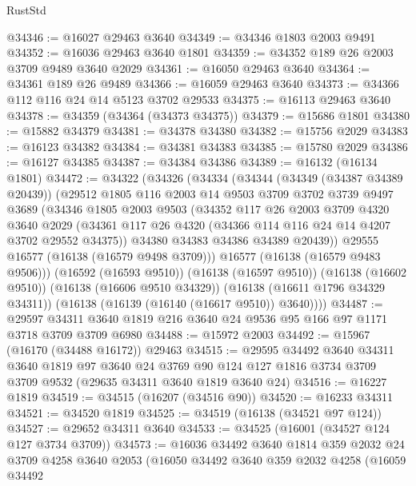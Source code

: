 \begin{lexlean}{RustStd}
\begin{coremodule}
@34346 := @16027 @29463 @3640
@34349 := @34346 @1803 @2003 @9491
@34352 := @16036 @29463 @3640 @1801
@34359 := @34352 @189 @26 @2003 @3709 @9489 @3640 @2029
@34361 := @16050 @29463 @3640
@34364 := @34361 @189 @26 @9489
@34366 := @16059 @29463 @3640
@34373 := @34366 @112 @116 @24 @14 @5123 @3702 @29533
@34375 := @16113 @29463 @3640
@34378 := @34359 (@34364 (@34373 @34375))
@34379 := @15686 @1801
@34380 := @15882 @34379
@34381 := @34378 @34380
@34382 := @15756 @2029
@34383 := @16123 @34382
@34384 := @34381 @34383
@34385 := @15780 @2029
@34386 := @16127 @34385
@34387 := @34384 @34386
@34389 := @16132 (@16134 @1801)
@34472 := @34322
    (@34326
      (@34334
        (@34344
          (@34349 (@34387 @34389 @20439))
          (@29512
            @1805
            @116
            @2003
            @14
            @9503
            @3709
            @3702
            @3739
            @9497
            @3689
            (@34346
              @1805
              @2003
              @9503
              (@34352
                @117
                @26
                @2003
                @3709
                @4320
                @3640
                @2029
                (@34361 @117 @26 @4320 (@34366 @114 @116 @24 @14 @4207 @3702 @29552 @34375))
                @34380
                @34383
                @34386
                @34389
                @20439))
            @29555
            @16577
            (@16138 (@16579 @9498 @3709)))
          @16577
          (@16138 (@16579 @9483 @9506)))
        (@16592 (@16593 @9510))
        (@16138 (@16597 @9510))
        (@16138 (@16602 @9510))
        (@16138 (@16606 @9510 @34329))
        (@16138 (@16611 @1796 @34329 @34311))
        (@16138 (@16139 (@16140 (@16617 @9510)) @3640))))
@34487 := @29597 @34311 @3640 @1819 @216 @3640 @24 @9536 @95 @166 @97 @1171 @3718 @3709 @3709 @6980
@34488 := @15972 @2003
@34492 := @15967 (@16170 (@34488 @16172)) @29463
@34515 := @29595
    @34492
    @3640
    @34311
    @3640
    @1819
    @97
    @3640
    @24
    @3769
    @90
    @124
    @127
    @1816
    @3734
    @3709
    @3709
    @9532
    (@29635 @34311 @3640 @1819 @3640 @24)
@34516 := @16227 @1819
@34519 := @34515 (@16207 (@34516 @90))
@34520 := @16233 @34311
@34521 := @34520 @1819
@34525 := @34519 (@16138 (@34521 @97 @124))
@34527 := @29652 @34311 @3640
@34533 := @34525 (@16001 (@34527 @124 @127 @3734 @3709))
@34573 := @16036
    @34492
    @3640
    @1814
    @359
    @2032
    @24
    @3709
    @4258
    @3640
    @2053
    (@16050
      @34492
      @3640
      @359
      @2032
      @4258
      (@16059
        @34492

\end{coremodule}
\end{lexlean}
